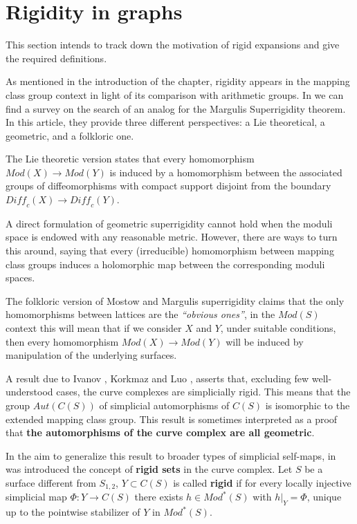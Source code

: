 \section{Rigidity in graphs}

This section intends to track down the motivation of rigid expansions and give the required definitions.

As mentioned in the introduction of the chapter, rigidity appears in the mapping class group context in light of its comparison with arithmetic groups. In \cite[Aramayona, Souto 16]{rigidityJA} we can find a survey on the search of an analog for the Margulis Superrigidity theorem. In this article, they provide three different perspectives: a Lie theoretical, a geometric, and a folkloric one.

The Lie theoretic version states that every homomorphism $Mod(X) \to Mod(Y)$ is induced by a homomorphism between the associated groups of diffeomorphisms with compact support disjoint from the boundary $\textit{Diff}_{c}(X) \to \textit{Diff}_{c}(Y)$.

A direct formulation of geometric superrigidity cannot hold when the moduli space is endowed with any reasonable metric. However, there are ways to turn this around, saying that every (irreducible) homomorphism between mapping class groups induces a holomorphic map between the corresponding moduli spaces.

The folkloric version of Mostow and Margulis superrigidity claims that the only homomorphisms between lattices are the \textit{“obvious ones”}, in the $Mod(S)$ context this will mean that if we consider $X$ and $Y$, under suitable conditions, then every homomorphism $Mod(X) \to Mod(Y)$ will be induced by manipulation of the underlying surfaces. 

A result due to Ivanov \cite[Ivanov 97]{celebratedIvanov}, Korkmaz \cite[Korkmaz 99]{celebratedKorkmaz} and Luo \cite[Luo 00]{celebratedLuo}, asserts that, excluding few well-understood cases, the curve complexes are simplicially rigid. This means that the group $Aut(C(S))$ of simplicial automorphisms of $C(S)$ is isomorphic to the extended mapping class group. This result is sometimes interpreted as a proof that \textbf{the automorphisms of the curve complex are all geometric}.

In the aim to generalize this result to broader types of simplicial self-maps, in \cite[Aramayona, Leininger 12]{finiteRigidSetsJA} was introduced the concept of \textbf{rigid sets} in the curve complex. Let $S$ be a surface different from $S_{1,2}$,  $Y \subset C(S)$ is called \textbf{rigid} if for every locally injective simplicial map $\Phi  : Y \to C(S)$ there exists $h \in Mod^{\ast}(S)$ with $h|_{Y} = \Phi$, unique up to the pointwise stabilizer of $Y$ in $Mod^{\ast}(S)$.

